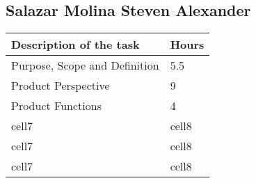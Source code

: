 \subsection{Salazar Molina Steven Alexander}
\begin{center}
\renewcommand{\arraystretch}{1.5}

\begin{tabular}{ |m{7cm}|m{2cm}| } 
 \hline
 \textbf{Description of the task}  & \textbf{Hours} \\
 \hline
 Purpose, Scope and Definition & 5.5 \\
 \hline
 Product Perspective & 9 \\ 
 \hline
 Product Functions & 4 \\ 
 \hline 
 cell7 & cell8 \\ 
 \hline
 cell7 & cell8 \\ 
 \hline
 cell7 & cell8 \\ 
 \hline
\end{tabular}
\end{center}
